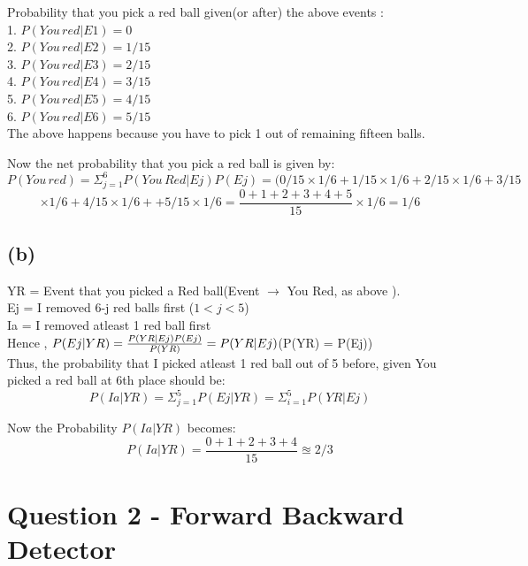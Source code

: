 \documentclass[11pt]{article}
\begin{document}
	Probability that you pick a red ball given(or after) the above events :\\
	1. \(P(You\,red|E1)= 0\)\\
	2. \( P(You\, red|E2) =  1/15\)\\
	3. \( P(You\, red|E3) =  2/15\)\\
	4. \( P(You\, red|E4) =  3/15\)\\
	5. \( P(You\, red|E5) =  4/15\)\\
	6. \( P(You\, red|E6) =  5/15\)\\
	
	The above happens because you have to pick 1 out of remaining fifteen balls.
	
	Now the net probability that you pick a red ball is given by:
	\[
		P(You\, red) = \Sigma_{j=1}^{6}P(You\,Red|Ej)P(Ej) = (0/15 \times 1/6 + 1/15 \times 1/6 + 2/15 \times 1/6 + 3/15 
	\]
	\[
		\times 1/6 + 4/15 \times 1/6 + + 5/15 \times 1/6 = \frac{0+1+2+3+4+5}{15}\times1/6 = \boxed{ 1/6}
	\]
	
	\subsection*{(b)}
	
	YR = Event that you picked a Red ball(Event \(\rightarrow\) You Red, as above ).\\
	Ej = I removed 6-j red balls first (\(1<j<5\))\\
	Ia = I removed atleast 1 red ball first\\
	
	Hence , \(P(Ej|YR) = \frac{P(YR|Ej)P(Ej)}{P(YR)} = P(YR|Ej)\dotfill\)(P(YR) = P(Ej))\\
	
	Thus, the probability that I picked atleast 1 red ball out of 5 before, given You picked a red ball at 6th place should be:
	\[
	P(Ia|YR) = \Sigma_{j=1}^5 P(Ej|YR) = \Sigma_{i=1}^{5} P(YR|Ej)
	\]
	
	Now the Probability \( P(Ia|YR) \) becomes:\\
	\[
	P(Ia|YR)= \frac{0 + 1 + 2 + 3 + 4}{15} 
	\approxeq \boxed{2/3}
	\]
	
\section*{\color{teal} Question 2 - Forward Backward Detector}
		
\end{document}
